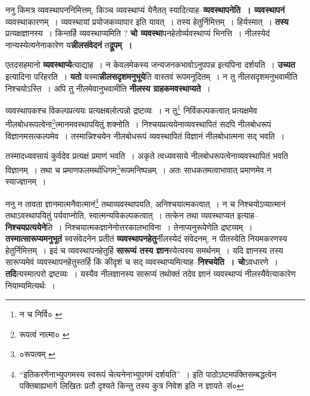 \documentclass[article,12pt,a4paper]{memoir}
\begin{document}
	  \pstart ननु किमत्र व्यवस्थापननिमित्तम्, किञ्च व्यवस्थाप्यं येनैतत् स्यादित्याह--\textbf{व्यवस्थापनेति । व्यवस्थापनं} व्यवस्थाकारणम् । व्यवस्थायां प्रयोजकव्यापार इति यावत् । तस्य हेतुर्निमित्तम् । हिर्यस्मात् । \textbf{तस्य} प्रत्यक्षज्ञानस्य । किन्तर्हि व्यवस्थाप्यमिति ? \textbf{चो व्यवस्था}पनहेतोर्व्यवस्थाप्यं भिनत्ति । नीलस्येदं नान्यस्येत्यनेनाकारेण य\textbf{न्नीलसंवेदनं} त\textbf{द्रूपम् ।}
	\pend
      

	  \pstart एतदसहमानो \textbf{व्यवस्थाप्ये}त्याद्याह । न केवलमेकस्य जन्यजनकभावोऽनुपपन्न इत्यपिना दर्शयति । \textbf{उच्यत} इत्यादिना परिहरति । \textbf{यतो} यस्मा\textbf{न्नीलसदृशमनुभूये}ति वास्तवं रूपमनूदितम् । न तु नीलसदृशमनुभवामीति निश्चयोऽस्ति । अपि तु नीलमेवानुभवामीति \textbf{नीलस्य ग्राहकमवस्थाप्यते} ।
	\pend
	  \bigskip
	  \begingroup
	

	  \pstart व्यवस्थापकश्च विकल्पप्रत्ययः प्रत्यक्षबलोत्पन्नो द्रष्टव्यः । न तु\footnote{न च निर्वि० \cite{dp-msC}} निर्विकल्पकत्वात् प्रत्यक्षमेव नीलबोधरूपत्वेना\footnote{रूपत्वं नात्मा० \cite{dp-msC}}\-त्मानमवस्थापयितुं शक्नोति । निश्चयप्रत्ययेनाव्यवस्थापितं सदपि नीलबोधरूपं विज्ञानमसत्कल्पमेव । तस्मान्निश्चयेन नीलबोधरूपं व्यवस्थापितं विज्ञानं नीलबोधात्मना सद् भवति ।
	\pend
       

	  \pstart तस्मादध्यवसायं कुर्वदेव प्रत्यक्षं प्रमाणं भवति । अकृते त्वध्यवसाये नीलबोधरूपत्वेनाव्यवस्थापितं भवति विज्ञानम् । तथा च प्रमाणफलमर्थाधिगम\footnote{०रूपत्वम् \cite{dp-msA} \cite{dp-msC} \cite{dp-msD} \cite{dp-edP} \cite{dp-edH} \cite{dp-edE}}\-रूपमनिष्पन्नम् । अतः साधकतमत्वाभावात् प्रमाणमेव न स्याज्ज्ञानम् ।
	\pend
      
	  \endgroup
	

	  \pstart ननु न तावता ज्ञानमात्मनैवात्मानं\footnote{“इतिकरणेनाभ्युपगमस्य स्वरूपं चेत्यनेनाभ्युपगमं दर्शयति” । इति पाठोऽष्टमपंक्तिसम्बद्धत्वेन पक्तिबाह्यभागे लिखितः प्रतौ दृश्यते किन्तु तस्य कुत्र निवेश इति न ज्ञायते--सं०} तथा\leavevmode{}व्यवस्थापयति, अनिश्चयात्मकत्वात् । न च निश्चयोऽप्यात्मानं तथाऽवस्थापयितुं पर्यवाप्नोति, स्वात्मन्यविकल्पकत्वात् । तत्केन तथा व्यवस्थाप्यत इत्याह--\textbf{निश्चयप्रत्ययेने}ति । निश्चयात्मकज्ञानेनोत्तरकालभाविना । तेनाप्यनुरूपेणेति द्रष्टव्यम् । \textbf{तस्मात्सारूप्यमनुभूतं} स्वसंवेदनेन प्रतीतं \textbf{व्यवस्थापनहेतु}र्नीलस्येदं संवेदनम्, न पीतस्येति नियमकरणस्य हेतुर्निमित्तम् । इदं च व्यवस्थापनहेतुर्हि \textbf{सारूप्यं तस्य ज्ञान}स्येत्यस्य समर्थनम् । यदि ज्ञानस्य तस्य सारूप्यमेवं व्यवस्थापनहेतुस्तर्हि किं कीदृशं च सद् व्यवस्थाप्यमित्याह--\textbf{निश्चयेति । चो}ऽवधारणे । \textbf{तदि}त्यस्मात्परो द्रष्टव्यः । यस्यैव नीलज्ञानस्य सारूप्यं तथोक्तं तदेव ज्ञानं व्यवस्थाप्यं नीलस्यैवेत्याकारेण नियाम्यमित्यर्थः ।
	\pend
      
\end{document}
